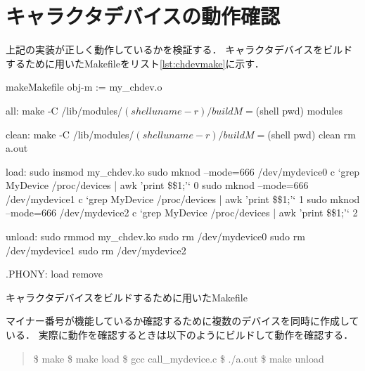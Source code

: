 \section{キャラクタデバイスの動作確認}
上記の実装が正しく動作しているかを検証する．
キャラクタデバイスをビルドするために用いたMakefileをリスト\ref{lst:chdevmake}に示す．
\begin{longlisting}
\begin{myminted}{make}{Makefile}
obj-m := my_chdev.o

all:
	make -C /lib/modules/$(shell uname -r)/build M=$(shell pwd) modules

clean:
	make -C /lib/modules/$(shell uname -r)/build M=$(shell pwd) clean
	rm a.out

load:
	sudo insmod my_chdev.ko
	sudo mknod --mode=666 /dev/mydevice0 c `grep MyDevice /proc/devices | awk '{print \$\$1;}'` 0
	sudo mknod --mode=666 /dev/mydevice1 c `grep MyDevice /proc/devices | awk '{print \$\$1;}'` 1
	sudo mknod --mode=666 /dev/mydevice2 c `grep MyDevice /proc/devices | awk '{print \$\$1;}'` 2

unload:
	sudo rmmod my_chdev.ko
	sudo rm /dev/mydevice0
	sudo rm /dev/mydevice1
	sudo rm /dev/mydevice2


.PHONY: load remove
\end{myminted}
\caption{キャラクタデバイスをビルドするために用いたMakefile}
\label{lst:chdevmake}
\end{longlisting}

マイナー番号が機能しているか確認するために複数のデバイスを同時に作成している．
実際に動作を確認するときは以下のようにビルドして動作を確認する．
\begin{quote}
\$ make
\$ make load
\$ gcc call\_mydevice.c
\$ ./a.out
\$ make unload
\end{quote}

